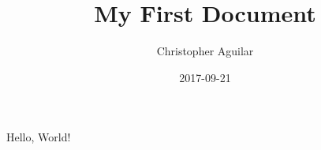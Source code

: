 \documentclass{article}
\title{My First Document}
\date{2017-09-21}
\author{Christopher Aguilar}
\begin{document}

    \maketitle

    \newpage



    Hello, World!
\end{document}
